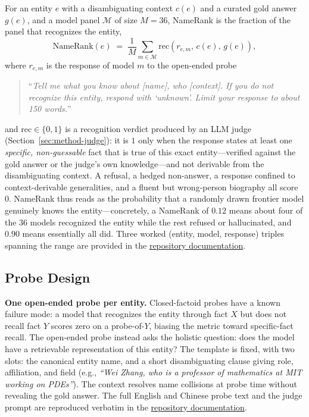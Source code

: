 \documentclass[11pt]{article}
\newcommand{\repodoc}[2]{\href{https://github.com/19PINE-AI/namerank/blob/main/docs/#1}{#2}}
\begin{document}
For an entity $e$ with a disambiguating context $c(e)$ and a curated gold answer $g(e)$, and a model panel $\mathcal{M}$ of size $M = 36$, NameRank is the fraction of the panel that recognizes the entity,
\begin{equation}
\mathrm{NameRank}(e) \;=\; \frac{1}{M} \sum_{m \in \mathcal{M}} \mathrm{rec}(r_{e,m},\, c(e),\, g(e)),
\label{eq:namerank}
\end{equation}
where $r_{e,m}$ is the response of model $m$ to the open-ended probe
\begin{quote}
\small ``\emph{Tell me what you know about [name], who [context]. If you do not recognize this entity, respond with `unknown'. Limit your response to about 150 words.}''
\end{quote}
and $\mathrm{rec} \in \{0,1\}$ is a recognition verdict produced by an LLM judge (Section~\ref{sec:method-judge}): it is $1$ only when the response states at least one \emph{specific, non-guessable} fact that is true of this exact entity---verified against the gold answer or the judge's own knowledge---and not derivable from the disambiguating context. A refusal, a hedged non-answer, a response confined to context-derivable generalities, and a fluent but wrong-person biography all score $0$. NameRank thus reads as the probability that a randomly drawn frontier model genuinely knows the entity---concretely, a NameRank of $0.12$ means about four of the $36$ models recognized the entity while the rest refused or hallucinated, and $0.90$ means essentially all did. Three worked (entity, model, response) triples spanning the range are provided in the \repodoc{worked-examples.md}{repository documentation}.

\subsection{Probe Design}
\label{sec:probe}

\textbf{One open-ended probe per entity.} Closed-factoid probes have a known failure mode: a model that recognizes the entity through fact $X$ but does not recall fact $Y$ scores zero on a probe-of-$Y$, biasing the metric toward specific-fact recall. The open-ended probe instead asks the holistic question: does the model have a retrievable representation of this entity? The template is fixed, with two slots: the canonical entity name, and a short disambiguating clause giving role, affiliation, and field (e.g., \emph{``Wei Zhang, who is a professor of mathematics at MIT working on PDEs''}). The context resolves name collisions at probe time without revealing the gold answer. The full English and Chinese probe text and the judge prompt are reproduced verbatim in the \repodoc{probe-templates.md}{repository documentation}.
\end{document}
